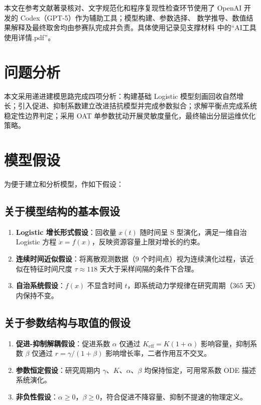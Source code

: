 \documentclass[12pt,a4paper]{ctexart}
\begin{document}
本文在参考文献著录核对、文字规范化和程序复现性检查环节使用了
OpenAI 开发的 Codex（GPT-5）作为辅助工具\cite{openai_codex}；模型构建、参数选择、
数学推导、数值结果解释及最终取舍均由参赛队完成并负责。具体使用记录见支撑材料
中的“AI工具使用详情.pdf”。


\section{问题分析}

本文采用递进建模思路完成四项分析：构建基础 Logistic 模型刻画回收自然增长；引入促进、抑制系数建立改进拮抗模型并完成参数拟合；求解平衡点完成系统稳定性边界判定；采用 OAT 单参数扰动开展灵敏度量化，最终输出分层运维优化策略。

\section{模型假设}

为便于建立和分析模型，作如下假设：

\subsection{关于模型结构的基本假设}

\begin{enumerate}
    \item \textbf{Logistic 增长形式假设}：回收量 $x(t)$ 随时间呈 S 型演化，满足一维自治 Logistic 方程 $\dot{x} = f(x)$，反映资源容量上限对增长的约束。

    \item \textbf{连续时间近似假设}：将离散观测数据（9 个时间点）视为连续演化过程，该近似在特征时间尺度 $\tau \approx 118$ 天大于采样间隔的条件下合理。

    \item \textbf{自治系统假设}：$f(x)$ 不显含时间 $t$，即系统动力学规律在研究周期（365 天）内保持不变。
\end{enumerate}

\subsection{关于参数结构与取值的假设}

\begin{enumerate}
    \item[4.] \textbf{促进-抑制解耦假设}：促进系数 $\alpha$ 仅通过 $K_{\text{eff}} = K(1+\alpha)$ 影响容量，抑制系数 $\beta$ 仅通过 $r = \gamma/(1+\beta)$ 影响增长率，二者作用互不交叉。

    \item[5.] \textbf{参数恒定假设}：研究周期内 $\gamma$、$K$、$\alpha$、$\beta$ 均保持恒定，可用常系数 ODE 描述系统演化。

    \item[6.] \textbf{非负性假设}：$\alpha \geq 0$，$\beta \geq 0$，符合促进不降容量、抑制不提速的物理定义。
\end{enumerate}
\end{document}
